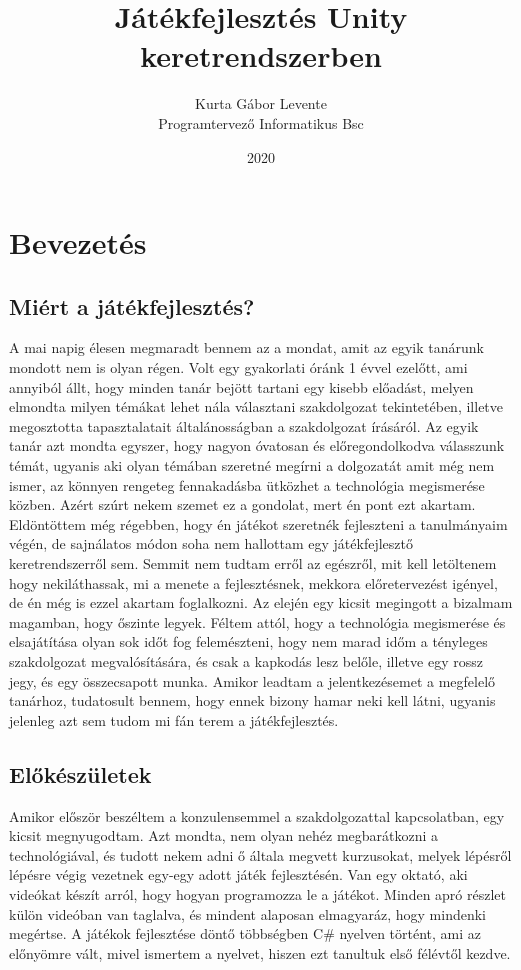 \documentclass[]{thesis-ekf}
\begin{document}
\title{Játékfejlesztés Unity keretrendszerben}
\author{Kurta Gábor Levente\\Programtervező Informatikus Bsc}
\date{2020}
\maketitle
\tableofcontents

\chapter{Bevezetés}
\section{Miért a játékfejlesztés?}
A mai napig élesen megmaradt bennem az a mondat, amit az egyik tanárunk mondott nem is olyan régen. Volt egy gyakorlati óránk 1 évvel ezelőtt, ami annyiból állt, hogy minden tanár bejött tartani egy kisebb előadást, melyen elmondta milyen témákat lehet nála választani szakdolgozat tekintetében, illetve megosztotta tapasztalatait általánosságban a szakdolgozat írásáról. Az egyik tanár azt mondta egyszer, hogy nagyon óvatosan és előregondolkodva válasszunk témát, ugyanis aki olyan témában szeretné megírni a dolgozatát amit még nem ismer, az könnyen rengeteg fennakadásba ütközhet a technológia megismerése közben. Azért szúrt nekem szemet ez a gondolat, mert én pont ezt akartam. Eldöntöttem még régebben, hogy én játékot szeretnék fejleszteni a tanulmányaim végén, de sajnálatos módon soha nem hallottam egy játékfejlesztő keretrendszerről sem. Semmit nem tudtam erről az egészről, mit kell letöltenem hogy nekiláthassak, mi a menete a fejlesztésnek, mekkora előretervezést igényel, de én még is ezzel akartam foglalkozni. Az elején egy kicsit megingott a bizalmam magamban, hogy őszinte legyek. Féltem attól, hogy a technológia megismerése és elsajátítása olyan sok időt fog felemészteni, hogy nem marad időm a tényleges szakdolgozat megvalósítására, és csak a kapkodás lesz belőle, illetve egy rossz jegy, és egy összecsapott munka. Amikor leadtam a jelentkezésemet a megfelelő tanárhoz, tudatosult bennem, hogy ennek bizony hamar neki kell látni, ugyanis jelenleg azt sem tudom mi fán terem a játékfejlesztés.

\section{Előkészületek}
Amikor először beszéltem a konzulensemmel a szakdolgozattal kapcsolatban, egy kicsit megnyugodtam. Azt mondta, nem olyan nehéz megbarátkozni a technológiával, és tudott nekem adni ő általa megvett kurzusokat, melyek lépésről lépésre végig vezetnek egy-egy adott játék fejlesztésén. Van egy oktató, aki videókat készít arról, hogy hogyan programozza le a játékot. Minden apró részlet külön videóban van taglalva, és mindent alaposan elmagyaráz, hogy mindenki megértse. A játékok fejlesztése döntő többségben C\# nyelven történt, ami az előnyömre vált, mivel ismertem a nyelvet, hiszen ezt tanultuk első félévtől kezdve.
\end{document}

